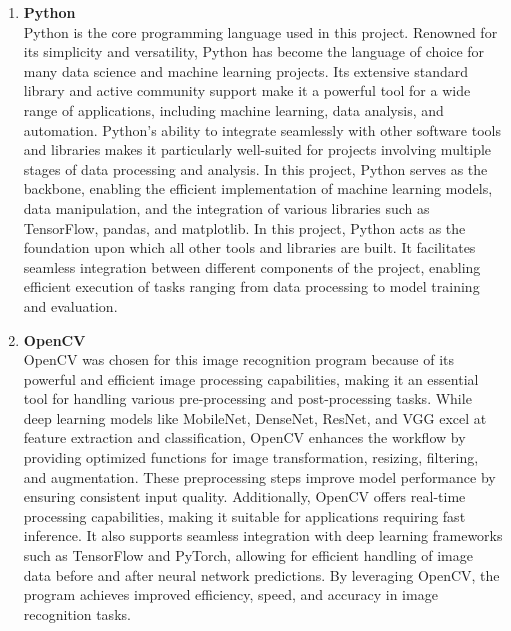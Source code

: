 \begin{enumerate}
	\item \textbf{Python} \\
	Python is the core programming language used in this project. Renowned for its simplicity and versatility, Python has become the language of choice for many data science and machine learning projects. Its extensive standard library and active community support make it a powerful tool for a wide range of applications, including machine learning, data analysis, and automation.
	Python's ability to integrate seamlessly with other software tools and libraries makes it particularly well-suited for projects involving multiple stages of data processing and analysis. In this project, Python serves as the backbone, enabling the efficient implementation of machine learning models, data manipulation, and the integration of various libraries such as TensorFlow, pandas, and matplotlib.
	In this project, Python acts as the foundation upon which all other tools and libraries are built. It facilitates seamless integration between different components of the project, enabling efficient execution of tasks ranging from data processing to model training and evaluation.
	
	
	\item \textbf{OpenCV} \\
	OpenCV was chosen for this image recognition program because of its powerful and efficient image processing capabilities, making it an essential tool for handling various pre-processing and post-processing tasks. While deep learning models like MobileNet, DenseNet, ResNet, and VGG excel at feature extraction and classification, OpenCV enhances the workflow by providing optimized functions for image transformation, resizing, filtering, and augmentation. These preprocessing steps improve model performance by ensuring consistent input quality. Additionally, OpenCV offers real-time processing capabilities, making it suitable for applications requiring fast inference. It also supports seamless integration with deep learning frameworks such as TensorFlow and PyTorch, allowing for efficient handling of image data before and after neural network predictions. By leveraging OpenCV, the program achieves improved efficiency, speed, and accuracy in image recognition tasks.
	

\end{enumerate}
